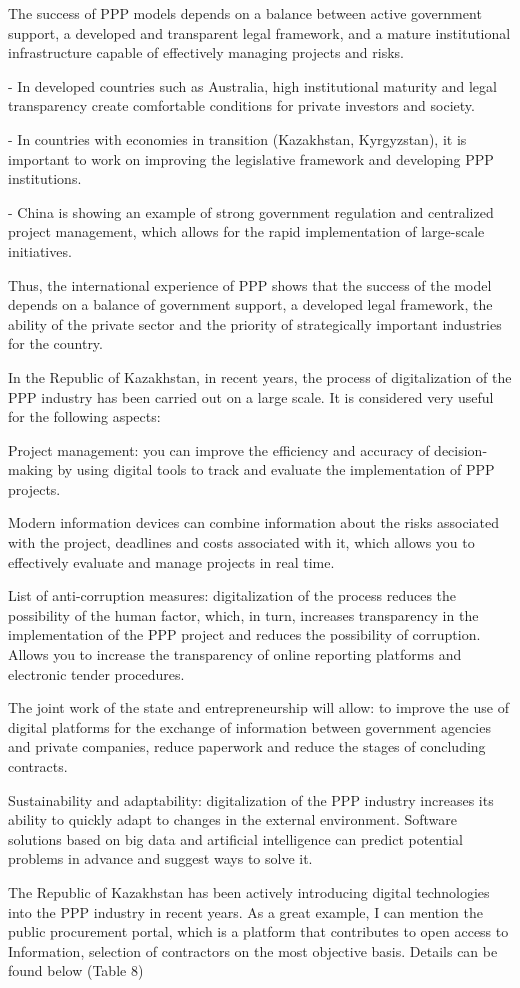 \begin{multicols}{2}
The success of PPP models depends on a balance between active government
support, a developed and transparent legal framework, and a mature
institutional infrastructure capable of effectively managing projects
and risks.

- In developed countries such as Australia, high institutional maturity
and legal transparency create comfortable conditions for private
investors and society.

- In countries with economies in transition (Kazakhstan, Kyrgyzstan), it
is important to work on improving the legislative framework and
developing PPP institutions.

- China is showing an example of strong government regulation and
centralized project management, which allows for the rapid
implementation of large-scale initiatives.

Thus, the international experience of PPP shows that the success of the
model depends on a balance of government support, a developed legal
framework, the ability of the private sector and the priority of
strategically important industries for the country.

In the Republic of Kazakhstan, in recent years, the process of
digitalization of the PPP industry has been carried out on a large
scale. It is considered very useful for the following aspects:

Project management: you can improve the efficiency and accuracy of
decision-making by using digital tools to track and evaluate the
implementation of PPP projects.

Modern information devices can combine information about the risks
associated with the project, deadlines and costs associated with it,
which allows you to effectively evaluate and manage projects in real
time.

List of anti-corruption measures: digitalization of the process reduces
the possibility of the human factor, which, in turn, increases
transparency in the implementation of the PPP project and reduces the
possibility of corruption. Allows you to increase the transparency of
online reporting platforms and electronic tender procedures.

The joint work of the state and entrepreneurship will allow: to improve
the use of digital platforms for the exchange of information between
government agencies and private companies, reduce paperwork and reduce
the stages of concluding contracts.

Sustainability and adaptability: digitalization of the PPP industry
increases its ability to quickly adapt to changes in the external
environment. Software solutions based on big data and artificial
intelligence can predict potential problems in advance and suggest ways
to solve it.

The Republic of Kazakhstan has been actively introducing digital
technologies into the PPP industry in recent years. As a great example,
I can mention the public procurement portal, which is a platform that
contributes to open access to Information, selection of contractors on
the most objective basis. Details can be found below (Table 8)
\end{multicols}

